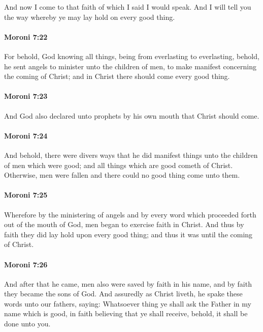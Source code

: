 			And now I come to that faith of which I said I would speak.
			And I will tell you the way whereby ye may lay hold on every good thing.

		\paragraph{Moroni 7:22} %
			\label{MORONI-7-22}

			For behold, God knowing all things,
			being from everlasting to everlasting,
			behold, he sent angels to minister unto the children of men,
			to make manifest concerning the coming of Christ;
			and in Christ there should come every good thing.

		\paragraph{Moroni 7:23} %
			\label{MORONI-7-23}

			And God also declared unto prophets by his own mouth
			that Christ should come.

		\paragraph{Moroni 7:24} %
			\label{MORONI-7-24}

			And behold, there were divers ways
			that he did manifest things unto the children of men which were good;
			and all things which are good cometh of Christ.
			Otherwise, men were fallen and there could no good thing come unto them.

		\paragraph{Moroni 7:25} %
			\label{MORONI-7-25}

			Wherefore by the ministering of angels
			and by every word which proceeded forth out of the mouth of God,
			men began to exercise faith in Christ.
			And thus by faith they did lay hold upon every good thing;
			and thus it was until the coming of Christ.

		\paragraph{Moroni 7:26} %
			\label{MORONI-7-26}

			And after that he came, men also were saved by faith in his name,
			and by faith they became the sons of God.
			And assuredly as Christ liveth, he spake these words unto our fathers, saying:
			Whatsoever thing ye shall ask the Father in my name which is good,
			in faith believing that ye shall receive,
			behold, it shall be done unto you.

